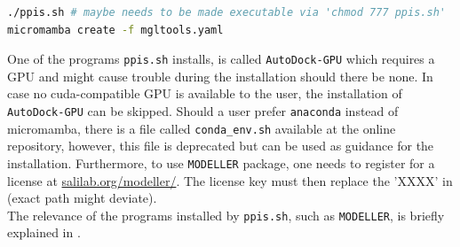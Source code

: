 \documentclass[9pt,tutorial]{livecoms}
\newcommand{\code}[1]{\colorbox{light-gray}{\texttt{#1}}}
\begin{document}
\begin{lstlisting}[language=bash]
./ppis.sh # maybe needs to be made executable via 'chmod 777 ppis.sh'
micromamba create -f mgltools.yaml
\end{lstlisting}
One of the programs \code{ppis.sh} installs, is called \texttt{AutoDock-GPU} which requires a GPU and might cause trouble during the installation should there be none. In case no cuda-compatible GPU is available to the user, the installation of \texttt{AutoDock-GPU} can be skipped. Should a user prefer \texttt{anaconda} instead of micromamba, there is a file called \code{conda\_env.sh} available at the online repository, however, this file is deprecated but can be used as guidance for the installation. Furthermore, to use \code{MODELLER} package, one needs to register for a license at \url{salilab.org/modeller/}. The license key must then replace the 'XXXX' in  (exact path might deviate).\\
The relevance of the programs installed by \code{ppis.sh}, such as \code{MODELLER}, is briefly explained in .
\onecolumn
\end{document}
